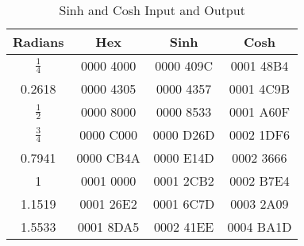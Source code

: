 \documentclass[11pt]{article}
\begin{document}
\begin{table}[h]
 \centering
 \caption{Sinh and Cosh Input and Output}
 \begin{tabular}{||c c c c||}
 \hline
 Radians & Hex & Sinh & Cosh \\ [0.5ex]
 \hline\hline
 $\frac{1}{4}$  & 0000 4000 & 0000 409C & 0001 48B4 \\
 \hline
 0.2618         & 0000 4305 & 0000 4357 & 0001 4C9B \\
 \hline
 $\frac{1}{2}$  & 0000 8000 & 0000 8533 & 0001 A60F \\
 \hline
 $\frac{3}{4}$  & 0000 C000 & 0000 D26D & 0002 1DF6 \\
 \hline
 0.7941         & 0000 CB4A & 0000 E14D & 0002 3666 \\
 \hline
 1              & 0001 0000 & 0001 2CB2 & 0002 B7E4 \\
 \hline
 1.1519         & 0001 26E2 & 0001 6C7D & 0003 2A09 \\
 \hline
 1.5533         & 0001 8DA5 & 0002 41EE & 0004 BA1D \\
 \hline
\end{tabular}
\end{table}



\printbibliography
\end{document}
